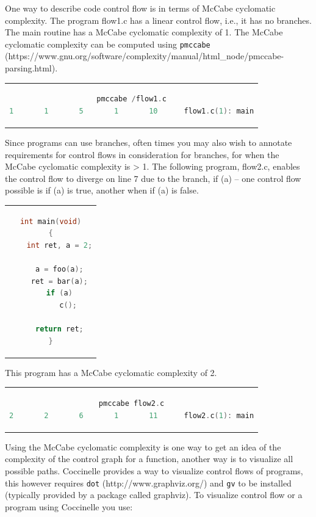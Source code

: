 One way to describe code control flow is in terms of McCabe cyclomatic
complexity.
The program flow1.c has a linear control flow, i.e., it has no
branches. The main
routine has a McCabe cyclomatic complexity of 1. The McCabe cyclomatic
complexity can be computed using
{\tt pmccabe} (https://www.gnu.org/\-software/\-complexity/\-manual/\-html\_node/\-pmccabe-parsing.html).

\begin{center}
\begin{tabular}{c}
\begin{lstlisting}[language=C]
pmccabe /flow1.c
1       1       5       1       10      flow1.c(1): main
\end{lstlisting}\\
\end{tabular}
\end{center}

Since programs can use branches, often times you may also wish to annotate
requirements for control flows in consideration for branches, for when
the McCabe cyclomatic complexity is > 1. The following program, flow2.c,
enables the control flow to diverge on line 7 due to the branch, if (a) --
one control flow possible is if (a) is true, another when if (a) is false.

\begin{center}
\begin{tabular}{c}
\begin{lstlisting}[language=C]
int main(void)
{
	int ret, a = 2;

	a = foo(a);
	ret = bar(a);
	if (a)
		c();

	return ret;
}
\end{lstlisting}\\
\end{tabular}
\end{center}

This program has a McCabe cyclomatic complexity of 2.

\begin{center}
\begin{tabular}{c}
\begin{lstlisting}[language=C]
pmccabe flow2.c
2       2       6       1       11      flow2.c(1): main
\end{lstlisting}\\
\end{tabular}
\end{center}

Using the McCabe cyclomatic complexity is one way to get an idea of
the complexity of the control graph for a function, another way is
to visualize all possible paths. Coccinelle provides a way to visualize
control flows of programs, this however requires {\tt dot}
(http://www.graphviz.org/) and {\tt gv} to be installed (typically provided
by a package called graphviz). To visualize control flow or a program
using Coccinelle you use:

